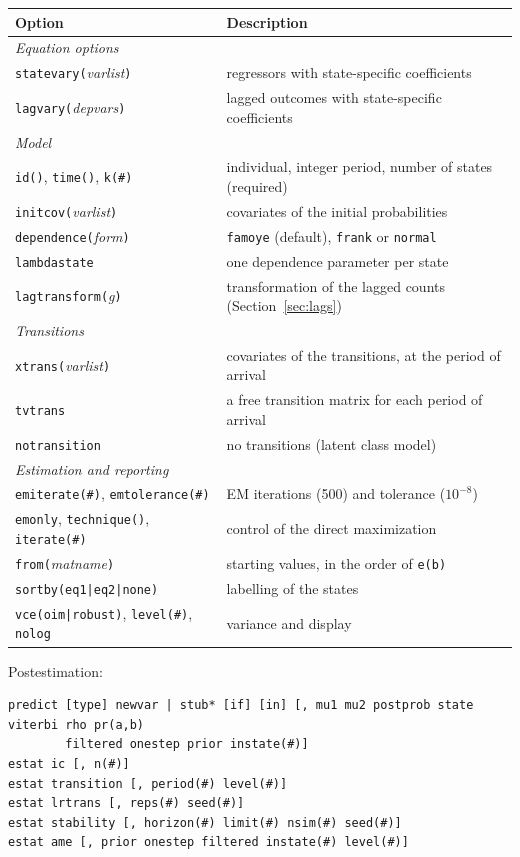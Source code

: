 \documentclass[11pt,a4paper]{article}
\newcommand{\cmd}[1]{\texttt{#1}}
\begin{document}
\begin{center}
\small
\begin{tabularx}{\textwidth}{lX}
\toprule
Option & Description\\
\midrule
\multicolumn{2}{l}{\emph{Equation options}}\\
\cmd{statevary(}\textit{varlist}\cmd{)} & regressors with state-specific coefficients\\
\cmd{lagvary(}\textit{depvars}\cmd{)} & lagged outcomes with state-specific coefficients\\
\midrule
\multicolumn{2}{l}{\emph{Model}}\\
\cmd{id()}, \cmd{time()}, \cmd{k(\#)} & individual, integer period, number of states (required)\\
\cmd{initcov(}\textit{varlist}\cmd{)} & covariates of the initial probabilities\\
\cmd{dependence(}\textit{form}\cmd{)} & \cmd{famoye} (default), \cmd{frank} or \cmd{normal}\\
\cmd{lambdastate} & one dependence parameter per state\\
\cmd{lagtransform(}\textit{g}\cmd{)} & transformation of the lagged counts (Section~\ref{sec:lags})\\
\midrule
\multicolumn{2}{l}{\emph{Transitions}}\\
\cmd{xtrans(}\textit{varlist}\cmd{)} & covariates of the transitions, at the period of arrival\\
\cmd{tvtrans} & a free transition matrix for each period of arrival\\
\cmd{notransition} & no transitions (latent class model)\\
\midrule
\multicolumn{2}{l}{\emph{Estimation and reporting}}\\
\cmd{emiterate(\#)}, \cmd{emtolerance(\#)} & EM iterations (500) and tolerance ($10^{-8}$)\\
\cmd{emonly}, \cmd{technique()}, \cmd{iterate(\#)} & control of the direct maximization\\
\cmd{from(}\textit{matname}\cmd{)} & starting values, in the order of \cmd{e(b)}\\
\cmd{sortby(eq1|eq2|none)} & labelling of the states\\
\cmd{vce(oim|robust)}, \cmd{level(\#)}, \cmd{nolog} & variance and display\\
\bottomrule
\end{tabularx}
\end{center}

Postestimation:
\begin{lstlisting}
predict [type] newvar | stub* [if] [in] [, mu1 mu2 postprob state viterbi rho pr(a,b)
        filtered onestep prior instate(#)]
estat ic [, n(#)]
estat transition [, period(#) level(#)]
estat lrtrans [, reps(#) seed(#)]
estat stability [, horizon(#) limit(#) nsim(#) seed(#)]
estat ame [, prior onestep filtered instate(#) level(#)]
\end{lstlisting}
\end{document}
